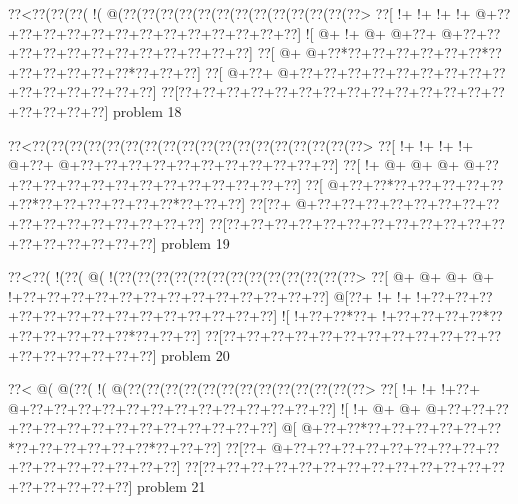 \vbox{\vbox{\goo
\0??<\0??(\0??(\0??(\- !(\- @(\0??(\0??(\0??(\0??(\0??(\0??(\0??(\0??(\0??(\0??(\0??(\0??(\0??>
\0??[\- !+\- !+\- !+\- !+\- @+\0??+\0??+\0??+\0??+\0??+\0??+\0??+\0??+\0??+\0??+\0??+\0??+\0??]
\- ![\- @+\- !+\- @+\- @+\0??+\- @+\0??+\0??+\0??+\0??+\0??+\0??+\0??+\0??+\0??+\0??+\0??+\0??]
\0??[\- @+\- @+\0??*\0??+\0??+\0??+\0??+\0??+\0??*\0??+\0??+\0??+\0??+\0??+\0??*\0??+\0??+\0??]
\0??[\- @+\0??+\- @+\0??+\0??+\0??+\0??+\0??+\0??+\0??+\0??+\0??+\0??+\0??+\0??+\0??+\0??+\0??]
\0??[\0??+\0??+\0??+\0??+\0??+\0??+\0??+\0??+\0??+\0??+\0??+\0??+\0??+\0??+\0??+\0??+\0??+\0??]
}
\hfil problem 18\hfil\break
}



\vbox{\vbox{\goo
\0??<\0??(\0??(\0??(\0??(\0??(\0??(\0??(\0??(\0??(\0??(\0??(\0??(\0??(\0??(\0??(\0??(\0??(\0??>
\0??[\- !+\- !+\- !+\- !+\- @+\0??+\- @+\0??+\0??+\0??+\0??+\0??+\0??+\0??+\0??+\0??+\0??+\0??]
\0??[\- !+\- @+\- @+\- @+\- @+\0??+\0??+\0??+\0??+\0??+\0??+\0??+\0??+\0??+\0??+\0??+\0??+\0??]
\0??[\- @+\0??+\0??*\0??+\0??+\0??+\0??+\0??+\0??*\0??+\0??+\0??+\0??+\0??+\0??*\0??+\0??+\0??]
\0??[\0??+\- @+\0??+\0??+\0??+\0??+\0??+\0??+\0??+\0??+\0??+\0??+\0??+\0??+\0??+\0??+\0??+\0??]
\0??[\0??+\0??+\0??+\0??+\0??+\0??+\0??+\0??+\0??+\0??+\0??+\0??+\0??+\0??+\0??+\0??+\0??+\0??]
}
\hfil problem 19\hfil\break
}



\vbox{\vbox{\goo
\0??<\0??(\- !(\0??(\- @(\- !(\0??(\0??(\0??(\0??(\0??(\0??(\0??(\0??(\0??(\0??(\0??(\0??(\0??>
\0??[\- @+\- @+\- @+\- @+\- !+\0??+\0??+\0??+\0??+\0??+\0??+\0??+\0??+\0??+\0??+\0??+\0??+\0??]
\- @[\0??+\- !+\- !+\- !+\0??+\0??+\0??+\0??+\0??+\0??+\0??+\0??+\0??+\0??+\0??+\0??+\0??+\0??]
\- ![\- !+\0??+\0??*\0??+\- !+\0??+\0??+\0??+\0??*\0??+\0??+\0??+\0??+\0??+\0??*\0??+\0??+\0??]
\0??[\0??+\0??+\0??+\0??+\0??+\0??+\0??+\0??+\0??+\0??+\0??+\0??+\0??+\0??+\0??+\0??+\0??+\0??]
}
\hfil problem 20\hfil\break
}



\vbox{\vbox{\goo
\0??<\- @(\- @(\0??(\- !(\- @(\0??(\0??(\0??(\0??(\0??(\0??(\0??(\0??(\0??(\0??(\0??(\0??(\0??>
\0??[\- !+\- !+\- !+\0??+\- @+\0??+\0??+\0??+\0??+\0??+\0??+\0??+\0??+\0??+\0??+\0??+\0??+\0??]
\- ![\- !+\- @+\- @+\- @+\0??+\0??+\0??+\0??+\0??+\0??+\0??+\0??+\0??+\0??+\0??+\0??+\0??+\0??]
\- @[\- @+\0??+\0??*\0??+\0??+\0??+\0??+\0??+\0??*\0??+\0??+\0??+\0??+\0??+\0??*\0??+\0??+\0??]
\0??[\0??+\- @+\0??+\0??+\0??+\0??+\0??+\0??+\0??+\0??+\0??+\0??+\0??+\0??+\0??+\0??+\0??+\0??]
\0??[\0??+\0??+\0??+\0??+\0??+\0??+\0??+\0??+\0??+\0??+\0??+\0??+\0??+\0??+\0??+\0??+\0??+\0??]
}
\hfil problem 21\hfil\break
}




